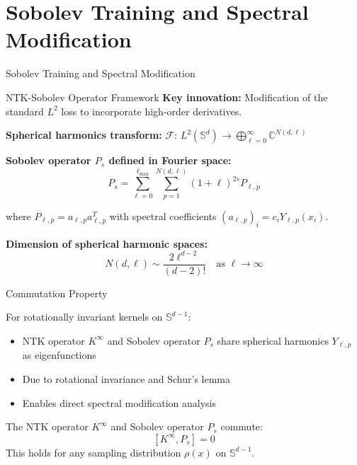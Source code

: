 \documentclass{beamer}
\begin{document}
\section{Sobolev Training and Spectral Modification}

\begin{frame}
\begin{center}
\huge{Sobolev Training and Spectral Modification}
\end{center}
\end{frame}

\begin{frame}{NTK-Sobolev Operator Framework}
\textbf{Key innovation:} Modification of the standard $L^2$ loss to incorporate high-order derivatives.

\textbf{Spherical harmonics transform:} $\mathcal{F}$: $L^2(\mathbb{S}^d) \to \bigoplus_{\ell=0}^{\infty} \mathbb{C}^{N(d,\ell)}$

\textbf{Sobolev operator $P_s$ defined in Fourier space:}
\[ P_s = \sum_{\ell=0}^{\ell_{\max}} \sum_{p=1}^{N(d,\ell)} (1+\ell)^{2s}P_{\ell,p} \]

where $P_{\ell,p} = a_{\ell,p}a_{\ell,p}^T$ with spectral coefficients $(a_{\ell,p})_i = c_iY_{\ell,p}(x_i)$.

\textbf{Dimension of spherical harmonic spaces:}
\[ N(d,\ell) \sim \frac{2\ell^{d-2}}{(d-2)!} \quad \text{as } \ell \to \infty \]
\end{frame}

\begin{frame}{Commutation Property}
\begin{theorem}
For rotationally invariant kernels on $\mathbb{S}^{d-1}$:
\begin{itemize}
\item NTK operator $K^{\infty}$ and Sobolev operator $P_s$ share spherical harmonics $Y_{\ell,p}$ as eigenfunctions
\item Due to rotational invariance and Schur's lemma
\item Enables direct spectral modification analysis
\end{itemize}
\end{theorem}

\begin{theorem}
The NTK operator $K^{\infty}$ and Sobolev operator $P_s$ commute:
\[ [K^{\infty}, P_s] = 0 \]
This holds for any sampling distribution $\rho(x)$ on $\mathbb{S}^{d-1}$.
\end{theorem}
\end{frame}
\end{document}

